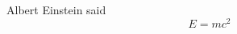 \documentclass[preview]{standalone}
\begin{document}
\begin{center}
Albert Einstein said \[E=mc^2\]
\end{center}
\end{document}
